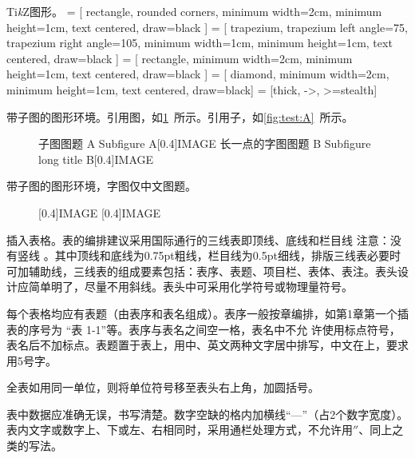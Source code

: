 Ti\textit{k}Z图形。
\usetikzlibrary{shapes.geometric, arrows}
 = [
rectangle,
rounded corners,
minimum width=2cm,
minimum height=1cm,
text centered,
draw=black
]
 = [
trapezium,
trapezium left angle=75,
trapezium right angle=105,
minimum width=1cm,
minimum height=1cm,
text centered,
draw=black
]
 = [
rectangle,
minimum width=2cm,
minimum height=1cm,
text centered,
draw=black
]
 = [
diamond,
minimum width=2cm,
minimum height=1cm,
text centered,
draw=black]
 = [thick, ->, >=stealth]

\begin{figure}[htbp]
	\centering
\end{figure}

带子图的图形环境。引用图，如\cref{fig:test}~所示。引用子，如\cref{fig:test:A}~所示。
\begin{figure}[!h]
    \centering
    \bisubcaptionbox
    {子图图题 A\label{fig:test:A}}
    {Subfigure A}[0.4\textwidth]{IMAGE}%
    \qquad
    \bisubcaptionbox
    {长一点的字图图题 B\label{fig:test:B}}
    {Subfigure long title B}[0.4\textwidth]{IMAGE}%
    \label{fig:test}
\end{figure}

带子图的图形环境，字图仅中文图题。
\begin{figure}[!h]
    \centering
    [0.4\textwidth]{IMAGE}%
    \qquad
    [0.4\textwidth]{IMAGE}%
\end{figure}

插入表格。表的编排建议采用国际通行的三线表即顶线、底线和栏目线 注意：没有竖线 。其中顶线和底线为0.75pt粗线，栏目线为0.5pt细线，排版三线表必要时可加辅助线，三线表的组成要素包括：表序、表题、项目栏、表体、表注。表头设计应简单明了，尽量不用斜线。表头中可采用化学符号或物理量符号。

每个表格均应有表题（由表序和表名组成）。表序一般按章编排，如第1章第一个插表的序号为 “表 1-1”等。表序与表名之间空一格，表名中不允 许使用标点符号，表名后不加标点。表题置于表上，用中、英文两种文字居中排写，中文在上，要求用5号字。

全表如用同一单位，则将单位符号移至表头右上角，加圆括号。

表中数据应准确无误，书写清楚。数字空缺的格内加横线“—”（占2个数字宽度）。表内文字或数字上、下或左、右相同时，采用通栏处理方式，不允许用$ '' $、同上之类的写法。

